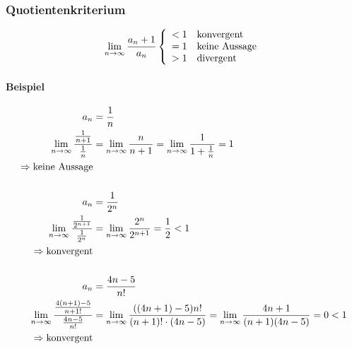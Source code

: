 \subsubsection{Quotientenkriterium}

\[
    \lim_{n \rightarrow \infty} \frac{a_n + 1}{a_n}
    \left \{
    \begin{array}{l}
        < 1 \quad \text{konvergent} \\
        = 1 \quad \text{keine Aussage} \\
        > 1 \quad \text{divergent}
    \end{array}
    \right .
\]

\paragraph{Beispiel}

\begin{align*}
    a_n &= \frac{1}{n} \\
    \lim_{n \rightarrow \infty} \frac{\frac{1}{n + 1}}{\frac{1}{n}} &= \lim_{n \rightarrow \infty} \frac{n}{n+1} = \lim_{n \rightarrow \infty} \frac{1}{1 + \frac{1}{n}} = 1 \\
    \Rightarrow \text{keine Aussage} \\
    \\
    a_n &= \frac{1}{2^n} \\
    \lim_{n \rightarrow \infty} \frac{\frac{1}{2^{n+1}}}{\frac{1}{2^n}} &= \lim_{n \rightarrow \infty} \frac{2^n}{2^{n+1}} = \frac{1}{2} < 1 \\
    \Rightarrow \text{konvergent} \\
    \\
    a_n &= \frac{4n-5}{n!} \\
    \lim_{n \rightarrow \infty} \frac{\frac{4(n+1) -5}{n+1!}}{\frac{4n-5}{n!}} &= \lim_{n \rightarrow \infty} \frac{((4n+1) -5) n!}{(n+1)!\cdot (4n-5)} = \lim_{n \rightarrow \infty} \frac{4n+1}{(n+1)(4n-5)} = 0 < 1 \\
    \Rightarrow \text{konvergent}
\end{align*}
